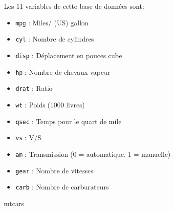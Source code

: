 \documentclass[]{book}
\newenvironment{Shaded}{\begin{snugshade}}{\end{snugshade}}
\newcommand{\NormalTok}[1]{#1}
\providecommand{\tightlist}{%
  \setlength{\itemsep}{0pt}\setlength{\parskip}{0pt}}
\begin{document}
Les 11 variables de cette base de données sont:

\begin{itemize}
\tightlist
\item
  \texttt{mpg} : Miles/ (US) gallon
\item
  \texttt{cyl} : Nombre de cylindres
\item
  \texttt{disp} : Déplacement en pouces cube
\item
  \texttt{hp} : Nombre de chevaux-vapeur
\item
  \texttt{drat} : Ratio
\item
  \texttt{wt} : Poids (1000 livres)
\item
  \texttt{qsec} : Temps pour le quart de mile
\item
  \texttt{vs} : V/S
\item
  \texttt{am} : Transmission (0 = automatique, 1 = manuelle)
\item
  \texttt{gear} : Nombre de vitesses
\item
  \texttt{carb} : Nombre de carburateurs
\end{itemize}

\begin{Shaded}
\begin{Highlighting}[]
\NormalTok{mtcars}
\end{Highlighting}
\end{Shaded}
\end{document}
